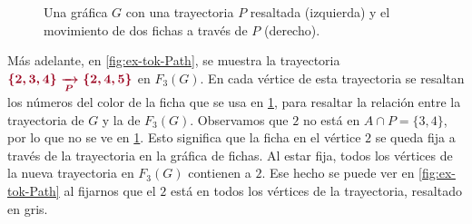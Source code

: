 \begin{figure}[ht!]
    \caption{Una gr\'afica $G$ con una trayectoria $P$ resaltada (izquierda) y
     el movimiento de dos fichas a trav\'es de $P$ (derecho).}
    \label{fig:ex-tok-aux}
\end{figure}
    
M\'as adelante, en \cref{fig:ex-tok-Path}, se muestra la trayectoria
${\color{vino}\boldsymbol {\{2,3,4\}\xrightarrow[P]{}\{2,4,5\}}}$ en $F_3(G)$.
En cada v\'ertice de esta trayectoria se resaltan los n\'umeros del color de la
ficha que se usa en \cref{fig:ex-tok-aux}, para resaltar la relaci\'on entre la
trayectoria de $G$ y la de $F_3(G)$. Observamos que $2$ no est\'a en $A \cap P
=\{3,4\}$, por lo que no se ve en \cref{fig:ex-tok-aux}. Esto significa que la
ficha en el v\'ertice $2$ se queda fija a trav\'es de la trayectoria en la
gr\'afica de fichas. Al estar fija, todos los v\'ertices de la nueva trayectoria
en $F_3(G)$ contienen a $2$. Ese hecho se puede ver en \cref{fig:ex-tok-Path} al
fijarnos que el $2$ est\'a en todos los v\'ertices de la trayectoria, resaltado
en gris.

